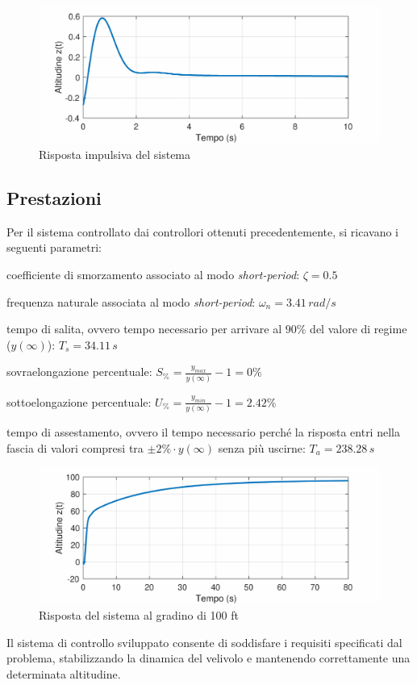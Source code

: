 \begin{figure}[H]
    \centering
    \includegraphics[width=0.7\linewidth]{Immagini/impulse_longitudinal.pdf}
    \caption{Risposta impulsiva del sistema}
\end{figure}

\subsection{Prestazioni}

Per il sistema controllato dai controllori ottenuti precedentemente, si ricavano i seguenti parametri:
\begin{sitemize}
    \item coefficiente di smorzamento associato al modo \textit{short-period}: $\zeta = 0.5$
    \item frequenza naturale associata al modo \textit{short-period}: $\omega_{n} = 3.41\, rad/s$
    \item tempo di salita, ovvero tempo necessario per arrivare al $90\%$ del valore di regime ($y(\infty)$): $T_{s} = 34.11\, s$
    \item sovraelongazione percentuale: $S_{\%} = \frac{y_{max}}{y(\infty)} -1 = 0\%$
    \item sottoelongazione percentuale: $U_{\%} = \frac{y_{min}}{y(\infty)} -1 = 2.42\%$
    \item tempo di assestamento, ovvero il tempo necessario perché la risposta entri nella fascia di valori compresi tra $\pm2\%\cdot y(\infty)$ senza più uscirne: $T_{a} = 238.28\, s$
\end{sitemize}

\begin{figure}[H]
    \centering
    \includegraphics[width=0.7\linewidth]{Immagini/step_longitudinal.pdf}
    \caption{Risposta del sistema al gradino di 100 ft}
\end{figure}

Il sistema di controllo sviluppato consente di soddisfare i requisiti specificati dal problema, stabilizzando la dinamica del velivolo e mantenendo correttamente una determinata altitudine.
